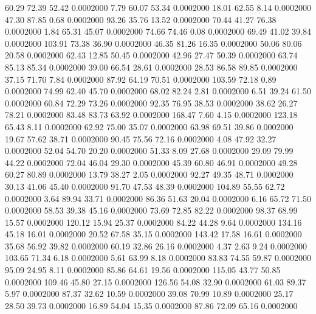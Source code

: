   60.29   72.39   52.42   0.0002000
   7.79   60.07   53.34   0.0002000
  18.01   62.55    8.14   0.0002000
  47.30   87.85    0.68   0.0002000
  93.26   35.76   13.52   0.0002000
  70.44   41.27   76.38   0.0002000
   1.84   65.31   45.07   0.0002000
  74.66   74.46    0.08   0.0002000
  69.49   41.02   39.84   0.0002000
 103.91   73.38   36.90   0.0002000
  46.35   81.26   16.35   0.0002000
  50.06   80.06   20.58   0.0002000
  62.43   12.85   50.45   0.0002000
  42.96   27.47   50.39   0.0002000
  63.74   85.13   85.34   0.0002000
  39.00   66.54   28.61   0.0002000
  28.53   86.58   89.85   0.0002000
  37.15   71.70    7.84   0.0002000
  87.92   64.19   70.51   0.0002000
 103.59   72.18    0.89   0.0002000
  74.99   62.40   45.70   0.0002000
  68.02   82.24    2.81   0.0002000
   6.51   39.24   61.50   0.0002000
  60.84   72.29   73.26   0.0002000
  92.35   76.95   38.53   0.0002000
  38.62   26.27   78.21   0.0002000
  83.48   83.73   63.92   0.0002000
 168.47    7.60    4.15   0.0002000
 123.18   65.43    8.11   0.0002000
  62.92   75.00   35.07   0.0002000
  63.98   69.51   39.86   0.0002000
  19.67   57.62   38.71   0.0002000
  90.45   75.56   72.16   0.0002000
   4.08   47.92   32.27   0.0002000
  52.04   54.70   20.20   0.0002000
  51.33    8.09   27.68   0.0002000
  29.09   79.99   44.22   0.0002000
  72.04   46.04   29.30   0.0002000
  45.39   60.80   46.91   0.0002000
  49.28   60.27   80.89   0.0002000
  13.79   38.27    2.05   0.0002000
  92.27   49.35   48.71   0.0002000
  30.13   41.06   45.40   0.0002000
  91.70   47.53   48.39   0.0002000
 104.89   55.55   62.72   0.0002000
   3.64   89.94   33.71   0.0002000
  86.36   51.63   20.04   0.0002000
   6.16   65.72   71.50   0.0002000
  58.53   39.38   45.16   0.0002000
  73.69   72.85   82.22   0.0002000
  98.37   68.99   15.57   0.0002000
 120.12   15.94   25.37   0.0002000
  84.22   44.28    9.64   0.0002000
 134.16   45.18   16.01   0.0002000
  20.52   67.58   35.15   0.0002000
 143.42   17.58   16.61   0.0002000
  35.68   56.92   39.82   0.0002000
  60.19   32.86   26.16   0.0002000
   4.37    2.63    9.24   0.0002000
 103.65   71.34    6.18   0.0002000
   5.61   63.99    8.18   0.0002000
  83.83   74.55   59.87   0.0002000
  95.09   24.95    8.11   0.0002000
  85.86   64.61   19.56   0.0002000
 115.05   43.77   50.85   0.0002000
 109.46   45.80   27.15   0.0002000
 126.56   54.08   32.90   0.0002000
  61.03   89.37    5.97   0.0002000
  87.37   32.62   10.59   0.0002000
  39.08   70.99   10.89   0.0002000
  25.17   28.50   39.73   0.0002000
  16.89   54.04   15.35   0.0002000
  87.86   72.09   65.16   0.0002000
